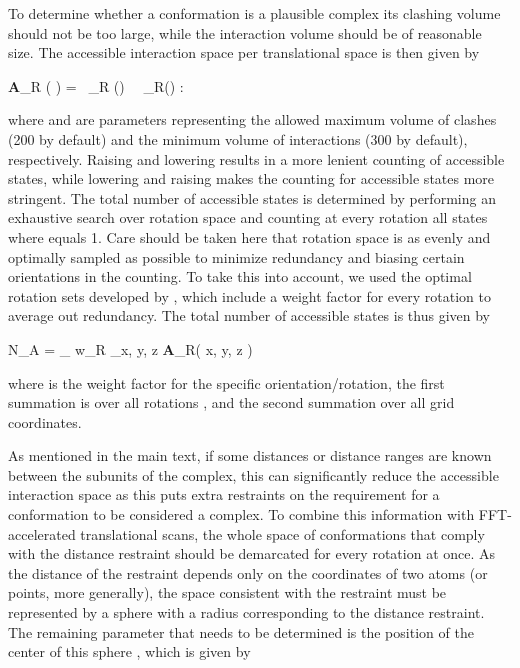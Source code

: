 To determine whether a conformation is a plausible complex its clashing volume
should not be too large, while the interaction volume should be of reasonable
size. The accessible interaction space per translational space is then given by

\startformula
{\bf A}_R \left( \rvec \right) = \startmathcases
\NC {}\ \boldC_R \left(\rvec \right) \leq \Cmax\ \ \boldI_R\left(\rvec \right) \geq \Imin:   \NR
\NC \NC \NR
\NC {}  \NR
\stopmathcases
\stopformula

where \m{\Cmax} and \m{\Imin} are parameters representing the allowed maximum
volume of clashes (200\Angstrom{} by default) and the minimum volume of
interactions (300\Angstrom{} by default), respectively. Raising \m{\Cmax}
and lowering \m{\Imin} results in a more lenient counting of accessible states,
while lowering \m{\Cmax} and raising \m{\Imin} makes the counting for
accessible states more stringent. The total number of accessible states is
determined by performing an exhaustive search over rotation space and counting
at every rotation all states where  equals 1.  Care should be
taken here that rotation space is as evenly and optimally sampled as possible
to minimize redundancy and biasing certain orientations in the counting. To
take this into account, we used the optimal rotation sets developed by
\citeauthor{Karney2007}, which include a weight factor for every rotation
to average out redundancy. The total number of accessible states  is
thus given by

\startformula
N_A = \sum_{\boldP} w_R \sum_{x, y, z} {\bf A}_R\left( x, y, z \right)
\stopformula

where  is the weight factor for the specific orientation/rotation, the first
summation is over all rotations \m{\boldP}, and the second summation over all grid
coordinates.



As mentioned in the main text, if some distances or distance ranges are known
between the subunits of the complex, this can significantly reduce the
accessible interaction space as this puts extra restraints on the requirement
for a conformation to be considered a complex. To combine this information with
FFT-accelerated translational scans, the whole space of conformations that
comply with the distance restraint should be demarcated for every rotation at
once. As the distance of the restraint depends only on the coordinates of two
atoms (or points, more generally), the space consistent with the restraint must
be represented by a sphere with a radius corresponding to the distance
restraint. The remaining parameter that needs to be determined is the position
of the center of this sphere , which is given by

